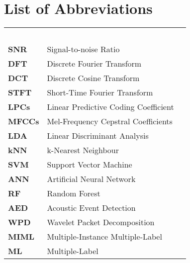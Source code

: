 

\chapter*{List of Abbreviations}


\renewcommand{\arraystretch}{1.4} 
\begin{longtable}{llr}
\multicolumn{3}{l}{\textbf{}\hspace{0.4\textwidth}~~}\\
\textbf{SNR}   &     Signal-to-noise Ratio\\
\textbf{DFT}   &                    Discrete Fourier Transform \\
\textbf{DCT}    &                    Discrete Cosine Transform \\
\textbf{STFT} & Short-Time Fourier Transform \\
\textbf{LPCs}	 &                   Linear Predictive Coding Coefficient \\
\textbf{MFCCs} &	       Mel-Frequency Cepstral Coefficients \\
\textbf{LDA}      &                  Linear Discriminant Analysis \\
\textbf{kNN}	  &                  k-Nearest Neighbour \\
\textbf{SVM}	     &               Support Vector Machine \\
\textbf{ANN}    &                   Artificial Neural Network \\
\textbf{RF}     &                      Random Forest \\
\textbf{AED}	   &                 Acoustic Event Detection \\
\textbf{WPD}     &                 Wavelet Packet Decomposition \\
\textbf{MIML}   &                 Multiple-Instance Multiple-Label  \\ 
\textbf{ML}    &                      Multiple-Label \\
\end{longtable}

